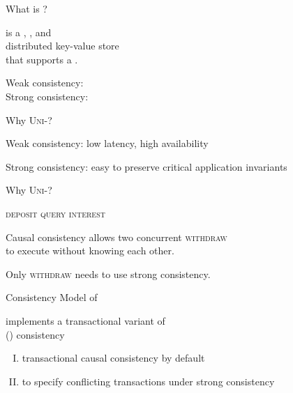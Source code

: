 \begin{frame}{What is \unistore?}
  \begin{center}
    \unistore{} is a , , and  \\[8pt]
     distributed key-value store \\[8pt]
    that supports a .

    \pause
    \vspace{0.80cm}
    Weak consistency: \cc \\[6pt]
    Strong consistency: \sr
  \end{center}
\end{frame}

\begin{frame}{Why \textsc{Uni-}?}
  \begin{center}
    Weak consistency: low latency, high availability


    Strong consistency: easy to preserve critical application invariants
  \end{center}
\end{frame}

\begin{frame}{Why \textsc{Uni-}?}
  \begin{center}
    \textsc{deposit \quad {} \quad query \quad interest}

    \pause
    \vspace{0.30cm}
    Causal consistency allows two concurrent \textsc{withdraw} \\
    to execute without knowing each other.

    \pause
    \vspace{0.30cm}
    Only \textsc{withdraw} needs to use strong consistency.
  \end{center}
\end{frame}

\begin{frame}{Consistency Model of \unistore}
  \begin{center}
    \unistore{} implements a transactional variant of \\
     (\por) consistency~\purple{
      \footnotesize [Li@ACT'2018]}

    \vspace{0.60cm}
    \begin{enumerate}[(I)]
      \centering
      \item transactional causal consistency by default
      \item to specify conflicting transactions under strong consistency
    \end{enumerate}
  \end{center}
\end{frame}

